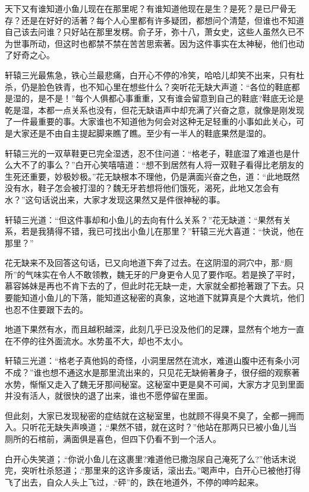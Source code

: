 \documentclass[12pt,oneside]{book}
\begin{document}
天下又有谁知道小鱼儿现在在那里呢？有谁知道他现在是生？是死？是已尸骨无存？还是在好好的活著？每个人心里都有许多疑团，都想问个清楚，但谁也不知道自己该去问谁？只好站在那里发楞。俞子牙，弥十八，萧女史，这些人虽然久已不为世事所动，但这时也都禁不禁在苦苦思索著。因为这件事实在太神秘，他们也动了好奇之心。

轩辕三光最焦急，铁心兰最悲痛，白开心不停的冷笑，哈哈儿却笑不出来，只有杜杀，仍是脸色铁青，也不知心里在想些什么？突听花无缺大声道：``各位的鞋底都是湿的，是不是！''每个人俱都心事重重，又有谁会留意到自己的鞋底?鞋底无论是乾是湿，本都一点关系也没有，但花无缺语声中却充满了兴奋之意，就像是刚发现了一件最重要的事。大家谁也不知道他为何会对这种无足轻重的小事如此关心，可是大家还是不由自主提起脚来瞧了瞧。至少有一半人的鞋底果然是湿的。

轩辕三光的一双草鞋更已完全湿透，忍不住问道：``格老子，鞋底湿了难道也是什么大不了的事么？''白开心笑嘻嘻道：``想不到居然有人将一双鞋子看得比老朋友的生死还重要，妙极妙极。''花无缺根本不理他，仍是满面兴奋之色，道：``此地既然没有水，鞋子怎会被打湿的？魏无牙若想将他们饿死，渴死，此地又怎会有水？''这句话说出来，大家才发现这果然又是件很神秘的事。

轩辕三光道：``但这件事却和小鱼儿的去向有什么关系？''花无缺道：``果然有关系，若是我猜得不错，我已可找出小鱼儿在那里？''轩辕三光大喜道：``快说，他在那里？''

花无缺来不及回答这句话，已又向地道下奔了过去。在这阴湿的洞穴中，那.``厕所''的气味实在令人不敢领教，魏无牙的尸身更令人见了要作呕。若是换了平时，慕容姊妹是再也不肯下去的了，但此时花无缺一走，大家就全都抢著跟了下去。只要能知道小鱼儿的下落，能知道这秘密的真象，这地道下就算真是个大粪坑，他们也忍不住要跟下去的。

地道下果然有水，而且越积越深，此刻几乎已没及他们的足踝，显然有个地方一直在不停的往外面流水。水势虽不大，却也不太小。

轩辕三光道：``格老子真他妈的奇怪，小洞里居然在流水，难道山腹中还有条小河不成？''谁也想不通这水是那里流出来的，只见花无缺俯著身子，很仔细的观察著水势，惭惭又走入了魏无牙那间秘室。这秘室中更是臭不可闻，大家方才见到里面并没有活人，就很快的退了出来，谁也不愿停留在里面。

但此刻，大家已发现秘密的症结就在这秘室里，也就顾不得臭不臭了，全都一拥而入。只听花无缺失声唤道；.``果然不错，就在这时？''他站在那两只已被小鱼儿当厕所的石棺前，满面俱是喜色，但四下仍看不到一个活人。

白开心失笑道；.``你说小鱼儿在这裹里?难道他已撒泡尿自己淹死了么?''他话末说完，突听杜杀怒道；.``那里来的这许多废话，滚出去。''喝声中，白开心已被他打得飞了出去，自众人头上飞过，.``砰''的，跌在地道外，不停的呻吟起来。
\end{document}
